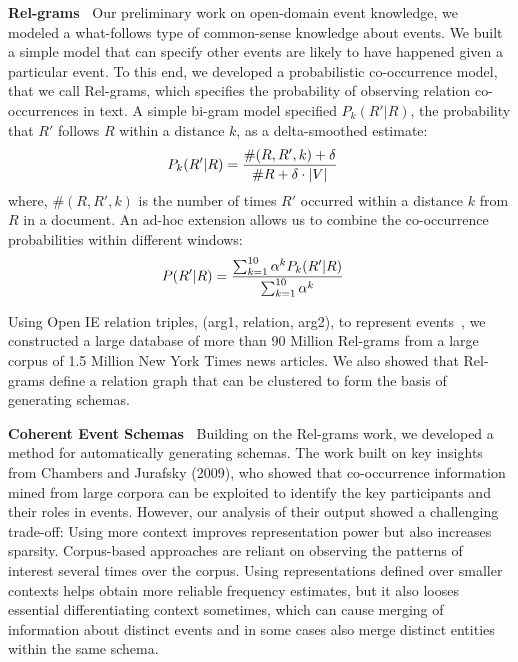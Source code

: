 \textbf{Rel-grams~\cite{balasubramanian-akbc12}}
Our preliminary work on open-domain event knowledge, we modeled a what-follows type of common-sense knowledge about events. We built a simple model that can specify other events are likely to have happened given a particular event. To this end, we developed a probabilistic co-occurrence model, that we call Rel-grams, which specifies the probability of observing relation co-occurrences in text. A simple bi-gram model specified $P_k(R'|R)$, the probability that $R'$ follows $R$  within a distance $k$, as a delta-smoothed estimate: 
\begin{align} 
\vspace{-2ex}
P_k(R'|R) &= \frac{\#(R,R',k) + \delta}{\#R + \delta \cdot |V|} 
\vspace{-2ex}
\end{align} 
where, $\#(R, R', k)$ is the number of times $R'$ occurred within a distance $k$ from $R$ in a 
document. An ad-hoc extension allows us to combine the co-occurrence probabilities within different windows: 
\begin{align} 
\vspace{-2ex}
P(R'|R) &= \frac{\sum_{k=1}^{10} \alpha^k P_k(R'|R)}
{\sum_{k=1}^{10} \alpha^k}
\vspace{-2ex}
\end{align} 

Using Open IE relation triples, (arg1, relation, arg2), to represent events~\cite{fader-emnlp11}, we constructed a large database of more than 90 Million Rel-grams from a large corpus of 1.5 Million New York Times news articles. We also showed that Rel-grams define a relation graph that can be clustered to form the basis of generating schemas.  

\textbf{Coherent Event Schemas~\cite{balasubramanian2013generating}} Building on the Rel-grams work, we developed a method for automatically generating schemas. The work built on key insights from Chambers and Jurafsky (2009), who showed that co-occurrence information mined from large corpora can be exploited to identify the key participants and their roles in events. However, our analysis of their output showed a challenging trade-off: Using more context improves representation power but also increases sparsity. Corpus-based approaches are reliant on observing the patterns of interest several times over the corpus. Using representations defined over smaller contexts helps obtain more reliable frequency estimates, but it also looses essential differentiating context sometimes, which can cause merging of information about distinct events and in some cases also merge distinct entities within the same schema.


